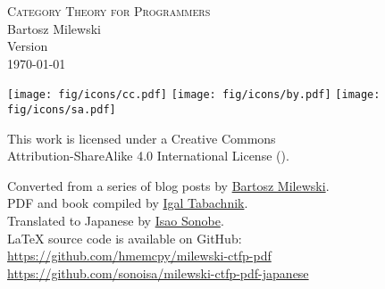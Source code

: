 \begin{small}
  \begin{center}

    \textsc{Category Theory for Programmers}\\

    \vspace{1.0em}
    \noindent
    Bartosz Milewski\\

    \vspace{1.26em}
    \noindent
    Version \texttt{\OPTversion}\\\today


    \vspace{1.6em}
    \noindent
    \texttt{[image: fig/icons/cc.pdf]}
    \texttt{[image: fig/icons/by.pdf]}
    \texttt{[image: fig/icons/sa.pdf]}

    \vspace{0.4em}
    \noindent
    This work is licensed under a Creative Commons\\
    Attribution-ShareAlike 4.0 International License
    (\href{http://creativecommons.org/licenses/by-sa/4.0/}{}).

    \vspace{1.26em}
    \noindent
    Converted from a series of blog posts by \href{https://bartoszmilewski.com/2014/10/28/category-theory-for-programmers-the-preface/}{Bartosz Milewski}.\\
    PDF and book compiled by \href{https://hmemcpy.com}{Igal Tabachnik}.\\
    Translated to Japanese by \href{https://github.com/sonoisa}{Isao Sonobe}.\\
    \vspace{1.26em}
    \noindent
    \LaTeX{} source code is available on GitHub: \\
    \href{https://github.com/hmemcpy/milewski-ctfp-pdf}{https://github.com/hmemcpy/milewski-ctfp-pdf}\\
    \href{https://github.com/sonoisa/milewski-ctfp-pdf-japanese}{https://github.com/sonoisa/milewski-ctfp-pdf-japanese}
  \end{center}
\end{small}
